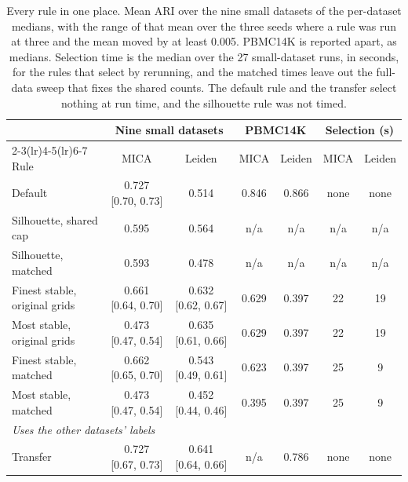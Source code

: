 \begin{table}[t]
\centering
\caption{Every rule in one place. Mean ARI over the nine small datasets of the per-dataset medians, with the range of that mean over the three seeds where a rule was run at three and the mean moved by at least 0.005. PBMC14K is reported apart, as medians. Selection time is the median over the 27 small-dataset runs, in seconds, for the rules that select by rerunning, and the matched times leave out the full-data sweep that fixes the shared counts. The default rule and the transfer select nothing at run time, and the silhouette rule was not timed.}
\label{tab:summary}
\footnotesize
\setlength{\tabcolsep}{4pt}
\begin{tabular}{lcccccc}
\toprule
 & \multicolumn{2}{c}{Nine small datasets} & \multicolumn{2}{c}{PBMC14K} & \multicolumn{2}{c}{Selection (s)} \\
\cmidrule(lr){2-3}\cmidrule(lr){4-5}\cmidrule(lr){6-7}
Rule & MICA & Leiden & MICA & Leiden & MICA & Leiden \\
\midrule
Default & 0.727 [0.70, 0.73] & 0.514 & 0.846 & 0.866 & none & none \\
Silhouette, shared cap & 0.595 & 0.564 & n/a & n/a & n/a & n/a \\
Silhouette, matched & 0.593 & 0.478 & n/a & n/a & n/a & n/a \\
Finest stable, original grids & 0.661 [0.64, 0.70] & 0.632 [0.62, 0.67] & 0.629 & 0.397 & 22 & 19 \\
Most stable, original grids & 0.473 [0.47, 0.54] & 0.635 [0.61, 0.66] & 0.629 & 0.397 & 22 & 19 \\
Finest stable, matched & 0.662 [0.65, 0.70] & 0.543 [0.49, 0.61] & 0.623 & 0.397 & 25 & 9 \\
Most stable, matched & 0.473 [0.47, 0.54] & 0.452 [0.44, 0.46] & 0.395 & 0.397 & 25 & 9 \\
\midrule
\multicolumn{7}{l}{\textit{Uses the other datasets' labels}} \\
Transfer & 0.727 [0.67, 0.73] & 0.641 [0.64, 0.66] & n/a & 0.786 & none & none \\
\bottomrule
\end{tabular}
\end{table}
